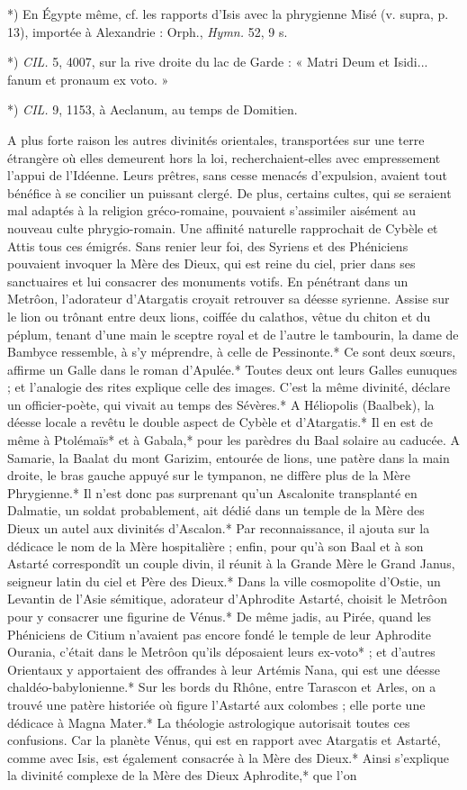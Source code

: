 \documentclass[a4paper, 11pt, oneside, polutonikogreek, french]{article}
\begin{document}
*) En Égypte même, cf. les rapports d'Isis avec la phrygienne Misé (v. supra, p. 13), importée à Alexandrie : Orph., \emph{Hymn.} 52, 9 s.

*) \emph{CIL.} 5, 4007, sur la rive droite du lac de Garde : « Matri Deum et Isidi... fanum et pronaum ex voto. »

*) \emph{CIL.} 9, 1153, à Aeclanum, au temps de Domitien.

A plus forte raison les autres divinités orientales, transportées sur une terre étrangère où elles demeurent hors la loi, recherchaient-elles avec empressement l'appui de l'Idéenne. Leurs prêtres, sans cesse menacés d'expulsion, avaient tout bénéfice à se concilier un puissant clergé. De plus, certains cultes, qui se seraient mal adaptés à la religion gréco-romaine, pouvaient s'assimiler aisément au nouveau culte phrygio-romain. Une affinité naturelle rapprochait de Cybèle et Attis tous ces émigrés. Sans renier leur foi, des Syriens et des Phéniciens pouvaient invoquer la Mère des Dieux, qui est reine du ciel, prier dans ses sanctuaires et lui consacrer des monuments votifs. En pénétrant dans un Metrôon, l'adorateur d'Atargatis croyait retrouver sa déesse syrienne. Assise sur le lion ou trônant entre deux lions, coiffée du calathos, vêtue du chiton et du péplum, tenant d'une main le sceptre royal et de l'autre le tambourin, la dame de Bambyce ressemble, à s'y méprendre, à celle de Pessinonte.* Ce sont deux sœurs, affirme un Galle dans le roman d'Apulée.* Toutes deux ont leurs Galles eunuques ; et l'analogie des rites explique celle des images. C'est la même divinité, déclare un officier-poète, qui vivait au temps des Sévères.* A Héliopolis (Baalbek), la déesse locale a revêtu le double aspect de Cybèle et d'Atargatis.* Il en est de même à Ptolémaïs* et à Gabala,* pour les parèdres du Baal solaire au caducée. A Samarie, la Baalat du mont Garizim, entourée de lions, une patère dans la main droite, le bras gauche appuyé sur le tympanon, ne diffère plus de la Mère Phrygienne.* Il n'est donc pas surprenant qu'un Ascalonite transplanté en Dalmatie, un soldat probablement, ait dédié dans un temple de la Mère des Dieux un autel aux divinités d'Ascalon.* Par reconnaissance, il ajouta sur la dédicace le nom de la Mère hospitalière ; enfin, pour qu'à son Baal et à son Astarté correspondît un couple divin, il réunit à la Grande Mère le Grand Janus, seigneur latin du ciel et Père des Dieux.* Dans la ville cosmopolite d'Ostie, un Levantin de l'Asie sémitique, adorateur d'Aphrodite Astarté, choisit le Metrôon pour y consacrer une figurine de Vénus.* De même jadis, au Pirée, quand les Phéniciens de Citium n'avaient pas encore fondé le temple de leur Aphrodite Ourania, c'était dans le Metrôon qu'ils déposaient leurs ex-voto* ; et d'autres Orientaux y apportaient des offrandes à leur Artémis Nana, qui est une déesse chaldéo-babylonienne.* Sur les bords du Rhône, entre Tarascon et Arles, on a trouvé une patère historiée où figure l'Astarté aux colombes ; elle porte une dédicace à Magna Mater.* La théologie astrologique autorisait toutes ces confusions. Car la planète Vénus, qui est en rapport avec Atargatis et Astarté, comme avec Isis, est également consacrée à la Mère des Dieux.* Ainsi s'explique la divinité complexe de la Mère des Dieux Aphrodite,* que l'on 
\end{document}
